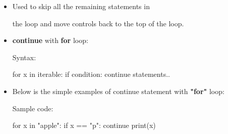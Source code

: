 \setlength{\columnsep}{3pt}


\begin{flushleft}

	
	\begin{itemize}

		\item Used to skip all the remaining statements in

		the loop and move controls back to the top of the loop.

		\item \textbf{continue} with \textbf{for} loop:

		\begin{tcolorbox}[breakable,notitle,boxrule=1pt,colback=pink,colframe=pink]

			\color{black}

			\font=8pt

			Syntax: 

			\newline

			for x in iterable: \newline
			\hphantom{} \hphantom{}  if condition: \newline
			\hphantom{} \hphantom{} \hphantom{} \hphantom{} continue \newline
			\hphantom{} \hphantom{} statements..

			\font=4pt

		\end{tcolorbox}			

		
		\bigskip

		
		\item Below is the simple examples of continue statement with \textbf{"for"} loop:

		
		Sample code:

		\begin{tcolorbox}[breakable,notitle,boxrule=-0pt,colback=code,colframe=code]

			\color{white}

			\font=8pt

			for x in "apple": \newline
			\hphantom{} \hphantom{} if x == "p": \newline
			\hphantom{} \hphantom{} \hphantom{} \hphantom{} continue \newline
			\hphantom{} \hphantom{} print(x)

			\font=4pt

		\end{tcolorbox}


\end{itemize}
\end{flushleft}
